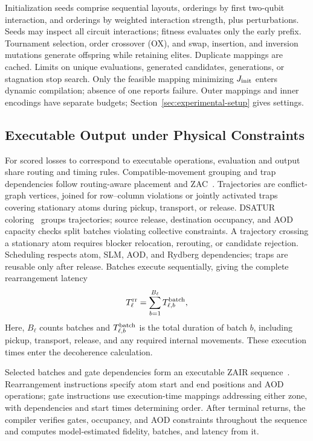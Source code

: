 Initialization seeds comprise sequential layouts, orderings by first two-qubit interaction, and orderings by weighted interaction strength, plus perturbations. Seeds may inspect all circuit interactions; fitness evaluates only the early prefix. Tournament selection, order crossover (OX), and swap, insertion, and inversion mutations generate offspring while retaining elites. Duplicate mappings are cached. Limits on unique evaluations, generated candidates, generations, or stagnation stop search. Only the feasible mapping minimizing $J_{\rm init}$ enters dynamic compilation; absence of one reports failure. Outer mappings and inner encodings have separate budgets; Section~\ref{sec:experimental-setup} gives settings.

\subsection{Executable Output under Physical Constraints}
\label{sec:routing}

For scored losses to correspond to executable operations, evaluation and output share routing and timing rules. Compatible-movement grouping and trap dependencies follow routing-aware placement and ZAC~\cite{stade2025routingaware,lin2025zac}. Trajectories are conflict-graph vertices, joined for row--column violations or jointly activated traps covering stationary atoms during pickup, transport, or release. DSATUR coloring~\cite{brelaz1979coloring} groups trajectories; source release, destination occupancy, and AOD capacity checks split batches violating collective constraints. A trajectory crossing a stationary atom requires blocker relocation, rerouting, or candidate rejection. Scheduling respects atom, SLM, AOD, and Rydberg dependencies; traps are reusable only after release. Batches execute sequentially, giving the complete rearrangement latency
\begin{equation}
T_\ell^{\rm rr}=\sum_{b=1}^{B_\ell}T_{\ell,b}^{\rm batch},
\label{eq:rearrangement-metrics}
\end{equation}
Here, $B_\ell$ counts batches and $T_{\ell,b}^{\rm batch}$ is the total duration of batch $b$, including pickup, transport, release, and any required internal movements. These execution times enter the decoherence calculation.

Selected batches and gate dependencies form an executable ZAIR sequence~\cite{lin2025zac}. Rearrangement instructions specify atom start and end positions and AOD operations; gate instructions use execution-time mappings addressing either zone, with dependencies and start times determining order. After terminal returns, the compiler verifies gates, occupancy, and AOD constraints throughout the sequence and computes model-estimated fidelity, batches, and latency from it.
